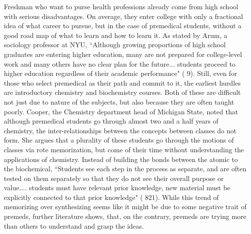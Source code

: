 \documentclass [12pt]{article}
\begin{document}
\begin{flushleft}
Freshman who want to purse health professions already come from high school with serious disadvantages. On average, they enter college with only a fractional idea of what career to pursue, but in the case of premedical students, without a good road map of what to learn and how to learn it. As stated by Arum, a sociology professor at NYU, {``}Although growing proportions of high school graduates are entering higher education, many are not prepared for college-level work and many others have no clear plan for the future... students proceed to higher education regardless of their academic performance" (\cite{Arum-2011} 9). Still, even for those who select premedical as their path and commit to it, the earliest hurdles are introductory chemistry and biochemistry courses. Both of these are difficult not just due to nature of the subjects, but also because they are often taught poorly. Cooper, the Chemistry department head of Michigan State, noted that although premedical students go through almost two and a half years of chemistry, the inter-relationships between the concepts between classes do not form. She argues that a plurality of these students go through the motions of classes via rote memorization, but come of their time without understanding the applications of chemistry. Instead of building the bonds between the atomic to the biochemical, {``}Students see each step in the process as separate, and are often tested on them separately so that they do not see their overall purpose or value.... students must have relevant prior knowledge, new material must be explicitly connected to that prior knowledge" (\cite{Cooper-2013} 821). While this trend of memorizing over synthesizing seems like it might be due to some negative trait of premeds, further literature shows, that, on the contrary, premeds are trying more than others to understand and grasp the ideas.



\end{flushleft}
\end{document}
